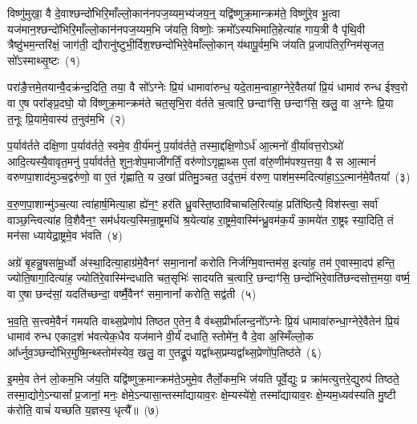 \setcounter{anuvakam}{0}
विष्णु॑मुखा॒ वै दे॒वाश्छन्दो॑भिरि॒माँल्लो॒कान॑नपज॒य्यम॒भ्य॑जय॒न्॒ यद्वि॑ष्णुक्र॒मान्क्रम॑ते॒ विष्णु॑रे॒व भू॒त्वा यज॑मान॒श्छन्दो॑भिरि॒माँल्लो॒कान॑नपज॒य्यम॒भि ज॑यति॒ विष्णोः॒ क्रमो᳚\-ऽस्यभिमाति॒हेत्या॑ह गाय॒त्री वै पृ॑थि॒वी त्रैष्ठु॑भम॒न्तरि॑क्षं॒ जाग॑ती॒ द्यौरानु॑ष्टुभी॒र्दिश॒श्छन्दो॑भिरे॒वेमाँल्लो॒कान् य॑थापू॒र्वम॒भि ज॑यति प्र॒जा\-प॑तिर॒ग्निम॑सृजत॒ सो᳚\-ऽस्माथ्सृ॒ष्टः~(१)

परा॑ङै॒त्तमे॒तयान्वै॒दक्र॑न्द॒दिति॒ तया॒ वै सो᳚\-ऽग्नेः प्रि॒यं धामावा॑रुन्ध॒ यदे॒ताम॒न्वाहा॒ग्नेरे॒वैतया᳚ प्रि॒यं धामाव॑ रुन्ध ईश्व॒रो वा ए॒ष परा᳚ङ्प्र॒दघो॒ यो वि॑ष्णुक्र॒मान्क्रम॑ते चत॒सृभि॒रा व॑र्तते च॒त्वारि॒ छन्दाꣳ॑सि॒ छन्दाꣳ॑सि॒ खलु॒ वा अ॒ग्नेः प्रि॒या त॒नूः प्रि॒यामे॒वास्य॑ त॒नुव॑म॒भि~(२)

प॒र्याव॑र्तते दक्षि॒णा प॒र्याव॑र्तते॒ स्वमे॒व वी॒र्य॑मनु॑ प॒र्याव॑र्तते॒ तस्मा॒द्दक्षि॒णो\-ऽर्ध॑ आ॒त्मनो॑ वी॒र्या॑वत्त॒रो\-ऽथो॑ आदि॒त्यस्यै॒वावृत॒मनु॑ प॒र्याव॑र्तते॒ शुनः॒शेप॒माजी॑गर्तिं॒ वरु॑णो\-ऽगृह्णा॒थ्स ए॒तां वा॑रु॒णीम॑पश्य॒त्तया॒ वै स आ॒त्मानं॑ वरुणपा॒शाद॑मुञ्च॒द्वरु॑णो॒ वा ए॒तं गृ॑ह्णाति॒ य उ॒खां प्र॑तिमु॒ञ्चत॒ उदु॑त्त॒मं व॑रुण॒ पाश॑म॒स्मदित्या॑हा॒\-ऽ॒\-ऽ॒त्मान॑मे॒वैतया᳚~(३)

व॒रु॒ण॒पा॒शान्मु॑ञ्च॒त्या त्वा॑हार्\mbox{}ष॒मित्या॒हा ह्ये॑न॒ꣳ॒ हर॑ति ध्रु॒वस्ति॒ष्ठावि॑चाचलि॒रित्या॑ह॒ प्रति॑ष्ठित्यै॒ विश॑स्त्वा॒ सर्वा॑ वाञ्छ॒न्त्वित्या॑ह वि॒शैवैन॒ꣳ॒ सम॑र्धयत्य॒स्मिन्रा॒ष्ट्रमधि॑ श्र॒येत्या॑ह रा॒ष्ट्रमे॒वास्मि॑न्ध्रु॒वम॑क॒र्यं का॒मये॑त रा॒ष्ट्रꣴ स्या॒दिति॒ तं मन॑सा ध्यायेद्रा॒ष्ट्रमे॒व भ॑वति~(४)

अग्रे॑ बृ॒हन्नु॒षसा॑मू॒र्ध्वो अ॑स्था॒दित्या॒हाग्र॑मे॒वैनꣳ॑ समा॒नानां᳚ करोति निर्जग्मि॒वान्तम॑स॒ इत्या॑ह॒ तम॑ ए॒वास्मा॒दप॑ हन्ति॒ ज्योति॒षागा॒दित्या॑ह॒ ज्योति॑रे॒वास्मि॑न्दधाति चत॒सृभिः॑ सादयति च॒त्वारि॒ छन्दाꣳ॑सि॒ छन्दो॑भिरे॒वाति॑छन्दसोत्त॒मया॒ वर्ष्म॒ वा ए॒षा छन्द॑सां॒ यदति॑च्छन्दा॒ वर्ष्मै॒वैनꣳ॑ समा॒नानां᳚ करोति॒ सद्व॑ती~(५)

भ॒व॒ति॒ स॒त्त्वमे॒वैनं॑ गमयति वाथ्स॒प्रेणोप॑ तिष्ठत ए॒तेन॒ वै व॑थ्स॒प्रीर्भा॑लन्द॒नो᳚\-ऽग्नेः प्रि॒यं धामावा॑रुन्धा॒ग्नेरे॒वैतेन॑ प्रि॒यं धामाव॑ रुन्ध एकाद॒शं भ॑वत्येक॒धैव यज॑माने वी॒र्यं॑ दधाति॒ स्तोमे॑न॒ वै दे॒वा अ॒स्मिँल्लो॒क आ᳚र्ध्नुव॒ञ्छन्दो॑भिर॒मुष्मि॒न्थ्स्तोम॑स्येव॒ खलु॒ वा ए॒तद्रू॒पं यद्वा᳚थ्स॒प्रम्यद्वा᳚थ्स॒प्रेणो॑प॒तिष्ठ॑ते~(६)

इ॒ममे॒व तेन॑ लो॒कम॒भि ज॑य॒ति यद्वि॑ष्णुक्र॒मान्क्रम॑ते॒\-ऽमुमे॒व तैर्लो॒कम॒भि ज॑यति पूर्वे॒द्युः प्र क्रा॑मत्युत्तरे॒द्युरुप॑ तिष्ठते॒ तस्मा॒द्योगे॒\-ऽन्यासां᳚ प्र॒जानां॒ मनः॒ क्षेमे॒\-ऽन्यासा॒न्तस्मा᳚द्यायाव॒रः क्षे॒म्यस्ये॑शे॒ तस्मा᳚द्यायाव॒रः क्षे॒म्यम॒ध्यव॑स्यति मु॒ष्टी क॑रोति॒ वाचं॑ यच्छति य॒ज्ञस्य॒ धृत्यै᳚॥~(७)

